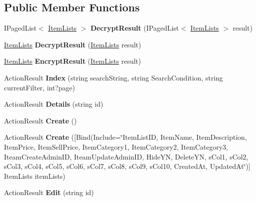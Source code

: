 \subsection*{Public Member Functions}
\begin{DoxyCompactItemize}
\item 
I\+Paged\+List$<$ \hyperlink{a00127}{Item\+Lists} $>$ {\bfseries Decrypt\+Result} (I\+Paged\+List$<$ \hyperlink{a00127}{Item\+Lists} $>$ result)\hypertarget{a00006_ad8659bd7cbef45426a79580f5510a0c6}{}\label{a00006_ad8659bd7cbef45426a79580f5510a0c6}

\item 
\hyperlink{a00127}{Item\+Lists} {\bfseries Decrypt\+Result} (\hyperlink{a00127}{Item\+Lists} result)\hypertarget{a00006_a6cc8574ddc153003f481966c0a5fa953}{}\label{a00006_a6cc8574ddc153003f481966c0a5fa953}

\item 
\hyperlink{a00127}{Item\+Lists} {\bfseries Encrypt\+Result} (\hyperlink{a00127}{Item\+Lists} result)\hypertarget{a00006_a41b71896627af57fe3fb98f47e6a6fdf}{}\label{a00006_a41b71896627af57fe3fb98f47e6a6fdf}

\item 
Action\+Result {\bfseries Index} (string search\+String, string Search\+Condition, string current\+Filter, int?page)\hypertarget{a00006_a1783cf8bee550d11b3138288b9f6f388}{}\label{a00006_a1783cf8bee550d11b3138288b9f6f388}

\item 
Action\+Result {\bfseries Details} (string id)\hypertarget{a00006_a8e4f59d0290a2d52cf6c6213a3dfb597}{}\label{a00006_a8e4f59d0290a2d52cf6c6213a3dfb597}

\item 
Action\+Result {\bfseries Create} ()\hypertarget{a00006_a10ee2bbef36674323c62a89ca16ef224}{}\label{a00006_a10ee2bbef36674323c62a89ca16ef224}

\item 
Action\+Result {\bfseries Create} (\mbox{[}Bind(Include=\char`\"{}Item\+List\+ID, Item\+Name, Item\+Description, Item\+Price, Item\+Sell\+Price, Item\+Category1, Item\+Category2, Item\+Category3, Iteam\+Create\+Admin\+ID, Iteam\+Update\+Admin\+ID, Hide\+YN, Delete\+YN, s\+Col1, s\+Col2, s\+Col3, s\+Col4, s\+Col5, s\+Col6, s\+Col7, s\+Col8, s\+Col9, s\+Col10, Created\+At, Updated\+At\char`\"{})\mbox{]} Item\+Lists item\+Lists)\hypertarget{a00006_a6436d4c70a0bcaab1145018b62c025dd}{}\label{a00006_a6436d4c70a0bcaab1145018b62c025dd}

\item 
Action\+Result {\bfseries Edit} (string id)\hypertarget{a00006_a43437cac4ef8a4e23727ee68861941d2}{}\label{a00006_a43437cac4ef8a4e23727ee68861941d2}


\end{DoxyCompactItemize}
